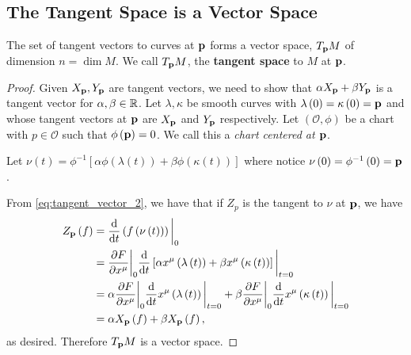 
\subsection{The Tangent Space is a Vector Space}


\begin{proposition}
    The set of tangent vectors to curves at $\vb{p}$ forms a vector space, $T_{\vb{p}} M$ of dimension $n = \dim M$. We call $T_{\vb{p}}M$, the \textbf{tangent space} to $M$ at $\vb{p}$.
\end{proposition}

\begin{proof}
    Given $X_{\vb{p}}, Y_{\vb{p}}$ are tangent vectors, we need to show that $\alpha X_{\vb{p}} + \beta Y_{\vb{p}}$ is a tangent vector for $\alpha, \beta \in \mathbb{R}$.
    Let $\lambda , \kappa$ be smooth curves with $\lambda \left( 0 \right) = \kappa \left( 0 \right) = \vb{p}$ and whose tangent vectors at $\vb{p}$ are $X_{\vb{p}}$ and $Y_{\vb{p}}$ respectively.
    Let $\left( \mathcal{O}, \phi \right) $ be a chart with $p \in \mathcal{O}$ such that $\phi \left( \vb{p} \right) = 0$. We call this a \textit{chart centered at $\vb{p}$}.

    Let $\nu \left( t \right) = \phi^{-1} \left[ \alpha \phi \left( \lambda \left( t \right)  \right) + \beta \phi \left( \kappa \left( t \right)  \right)  \right] $ where notice $\nu \left( 0 \right) = \phi^{-1} \left( 0 \right) = \vb{p}$.

    From \cref{eq:tangent_vector_2}, we have that if $Z_p$ is the tangent to $\nu$ at $\vb{p}$, we have
    \begin{align}
        Z_{\vb{p}}\left( f \right) &= \dv{t} \left( f \left( \nu \left( t \right)  \right)  \right) \bigg|_{0} \\
        &= \pdv{F}{x^{\mu}} \bigg|_{0} \dv{t} \left[ \alpha x^{\mu} \left( \lambda\left( t \right)\right)   + \beta x^{\mu}\left( \kappa \left( t \right)  \right)   \right] \bigg|_{t=0}\\
        &= \alpha \pdv{F}{x^{\mu}} \bigg|_{0} \dv{t} x^{\mu}\left( \lambda \left( t \right)  \right) \bigg|_{t=0} + \beta \pdv{F}{x^{\mu}} \bigg|_{0} \dv{t} x^{\mu}\left( \kappa \left( t \right)  \right) \bigg|_{t=0}  \\
        &= \alpha X_{\vb{p}}\left( f \right) + \beta X_{\vb{p}}\left( f \right) 
    ,\end{align}
    as desired. Therefore $T_{\vb{p}}M$ is a vector space.
\end{proof}

